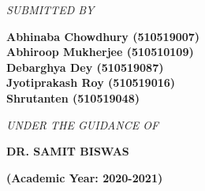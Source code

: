 \documentclass[a4paper]{article}
\begin{document}
\begin{titlepage}
\begin{center}
        \textit{SUBMITTED BY}\\[0.3cm]
        \begin{large}
            \textbf{Abhinaba Chowdhury (510519007)}\\[0.1cm]
            \textbf{Abhiroop Mukherjee (510510109)}\\[0.1cm]
            \textbf{Debarghya Dey (510519087)}\\[0.1cm]
            \textbf{Jyotiprakash Roy (510519016)}\\[0.1cm]
            \textbf{Shrutanten (510519048)}\\[1cm]
        \end{large}

        \textit{UNDER THE GUIDANCE OF}\\[0.5cm]
        \begin{large}
            \textbf{DR. SAMIT BISWAS}\\[0.3cm]
        \end{large}

        \textbf{(Academic Year: 2020-2021)}
    \end{center}
\end{titlepage}
\end{document}
